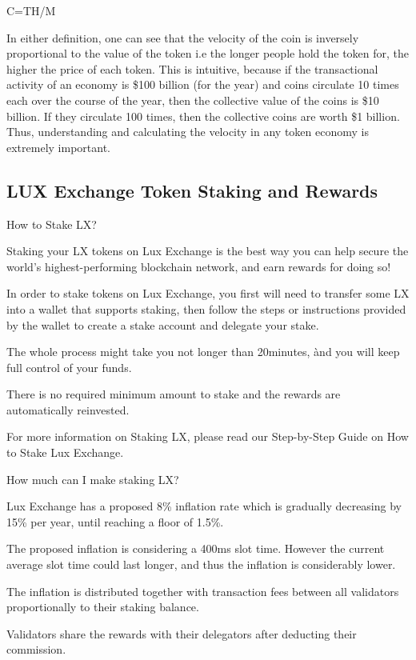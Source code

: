 \documentclass[11pt]{article}
\begin{document}
C=TH/M


In either definition, one can see that the velocity of the coin is inversely proportional to the value of the token i.e the longer people hold the token for, the higher the price of each token. This is intuitive, because if the transactional activity of an economy is \$100 billion (for the year) and coins circulate 10 times each over the course of the year, then the collective value of the coins is \$10 billion. If they circulate 100 times, then the collective coins are worth \$1 billion. Thus, understanding and calculating the velocity in any token economy is extremely important.


\subsection{LUX Exchange Token Staking and Rewards}

How to Stake LX?


Staking your LX tokens on Lux Exchange is the best way you can help secure the world's highest-performing blockchain network, and earn rewards for doing so!


In order to stake tokens on Lux Exchange, you first will need to transfer some LX into a wallet that supports staking, then follow the steps or instructions provided by the wallet to create a stake account and delegate your stake.


The whole process might take you not longer than 20minutes, ànd you will keep full control of your funds.


There is no required minimum amount to stake and the rewards are automatically reinvested.


For more information on Staking LX, please read our Step-by-Step Guide on How to Stake Lux Exchange.


How much can I make staking LX?


Lux Exchange has a proposed 8\% inflation rate which is gradually decreasing by 15\% per year, until reaching a floor of 1.5\%.


The proposed inflation is considering a 400ms slot time. However the current average slot time could last longer, and thus the inflation is considerably lower.


The inflation is distributed together with transaction fees between all validators proportionally to their staking balance.


Validators share the rewards with their delegators after deducting their commission.
\end{document}
